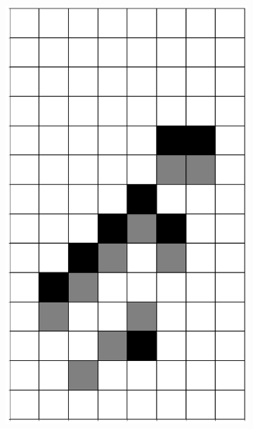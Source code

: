 \documentclass[12pt]{article}
\numberwithin{figure}{section} %
\begin{document}
\begin{figure}[H]
\begin{subfigure}{0.18\textwidth}
     		\includegraphics[width=\linewidth]{Section4/17.1}
     		\subcaption{}
   	\end{subfigure}
        \begin{subfigure}{0.18\textwidth}
     		\centering

\end{subfigure}
\end{figure}
\end{document}
